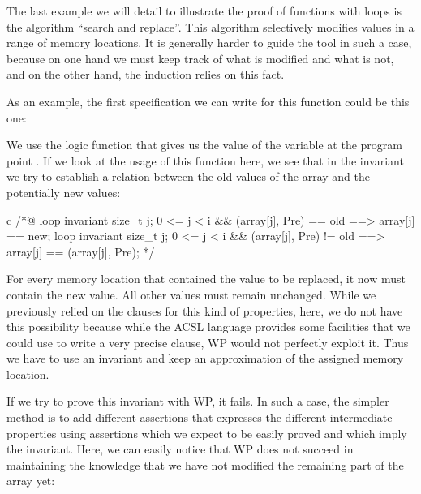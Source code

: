 \label{l4:statements-loops-ex-search-and-replace}


The last example we will detail to illustrate the proof of functions
with loops is the algorithm ``search and replace''. This algorithm
selectively modifies values in a range of memory locations. It is
generally harder to guide the tool in such a case, because on one hand
we must keep track of what is modified and what is not, and on the other
hand, the induction relies on this fact.

As an example, the first specification we can write for this function
could be this one:






We use the logic function  that gives us the
value of the variable  at the program point .
If we look at the usage of this function here, we see that in the
invariant we try to establish a relation between the old values of the
array and the potentially new values:



\begin{CodeBlock}{c}
/*@
  loop invariant \forall size_t j; 0 <= j < i && \at(array[j], Pre) == old
                   ==> array[j] == new;
  loop invariant \forall size_t j; 0 <= j < i && \at(array[j], Pre) != old
                   ==> array[j] == \at(array[j], Pre);
*/
\end{CodeBlock}



For every memory location that contained the value to be replaced, it now must
contain the new value. All other values must remain unchanged. While we
previously relied on the  clauses for this kind of properties,
here, we do not have this possibility because while the ACSL language provides
some facilities that we could use to write a very precise 
clause, WP would not perfectly exploit it. Thus we have to use an invariant and
keep an approximation of the assigned memory location.

If we try to prove this invariant with WP, it fails. In such a case, the simpler
method is to add different assertions that expresses the different
intermediate properties using assertions which we expect to be easily proved
and which imply the invariant. Here, we can easily notice that WP does not
succeed in maintaining the knowledge that we have not modified the remaining
part of the array yet:




